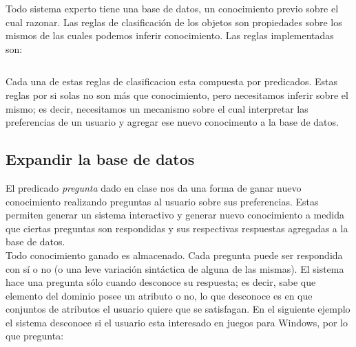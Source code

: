 \documentclass[11pt,oneside,a4paper]{article}
\begin{document}

Todo sistema experto tiene una base de datos, un conocimiento previo sobre el
cual razonar. Las reglas de clasificación de los objetos son propiedades
sobre los mismos de las cuales podemos inferir conocimiento. Las reglas 
implementadas son:

\inputminted[firstline=17, lastline=31, fontsize=\footnotesize]{perl}{tp-prolog.pl}

Cada una de estas reglas de clasificacion esta compuesta por predicados.
Estas reglas por si solas no son más que conocimiento, pero necesitamos inferir 
sobre el mismo; es decir, necesitamos un mecanismo sobre el cual interpretar las preferencias 
de un usuario y agregar ese nuevo conocimento a la base de datos.

\subsection{Expandir la base de datos}

El predicado \emph{pregunta} dado en clase nos da una forma de ganar nuevo conocimiento
realizando preguntas al usuario sobre sus preferencias.
Estas permiten generar un sistema interactivo y generar nuevo %
conocimiento a medida que ciertas preguntas son respondidas y sus respectivas respuestas
agregadas a la base de datos.\\



Todo conocimiento ganado es almacenado.
Cada pregunta puede ser respondida con sí o no (o una leve variación 
sintáctica de alguna de las mismas). El sistema hace una pregunta 
sólo cuando desconoce su respuesta; es decir, sabe que elemento del dominio 
posee un atributo o no, lo que desconoce es en que conjuntos de atributos 
el usuario quiere que se satisfagan. En el siguiente ejemplo el 
sistema desconoce si el usuario esta interesado en juegos para Windows, por lo
que pregunta:\\
\end{document}
